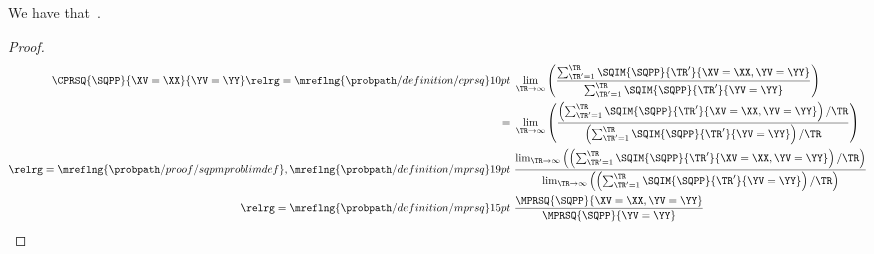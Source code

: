 \begin{proposition}
  We have that\ \cprsqexprprop.%
\end{proposition}

\begin{proof}
  \begin{align*}
    \CPRSQ{\SQPP}{\XV = \XX}{\YV = \YY} 
    \relrg = {\mreflng{\probpath/definition/cprsq}} 10pt \ & 
    \lim_{\TR \rightarrow \infty}
    \left(
    \frac
    {\sum_{\TR' = 1}^{\TR}\SQIM{\SQPP}{\TR'}{\XV = \XX, \YV = \YY}}
    {\sum_{\TR' = 1}^{\TR}\SQIM{\SQPP}{\TR'}{\YV = \YY}}
    \right)\\
    = \ &
    \lim_{\TR \rightarrow \infty}
    \left(
    \frac
    {\left({\sum_{\TR' = 1}^{\TR}\SQIM{\SQPP}{\TR'}{\XV = \XX, \YV = \YY}}\right)/{\TR}}
    {\left(\sum_{\TR' = 1}^{\TR}\SQIM{\SQPP}{\TR'}{\YV = \YY}\right)/\TR}
    \right)\\
    \relrg = {\mreflng{\probpath/proof/sqpmproblimdef},\mreflng{\probpath/definition/mprsq}} 19pt \ & 
    \frac
    {
      \lim_{\TR \rightarrow \infty}\left(
    \left({\sum_{\TR' = 1}^{\TR}\SQIM{\SQPP}{\TR'}{\XV = \XX, \YV = \YY}}\right)/{\TR}\right)}
    {
      \lim_{\TR \rightarrow \infty}\left(
    \left(\sum_{\TR' = 1}^{\TR}\SQIM{\SQPP}{\TR'}{\YV = \YY}\right)/\TR\right)}
    \\
    \relrg = {\mreflng{\probpath/definition/mprsq}} 15pt \ & 
    \frac { \MPRSQ{\SQPP}{\XV = \XX, \YV = \YY} } { \MPRSQ{\SQPP}{\YV = \YY} }\\
  \end{align*}
\end{proof}
